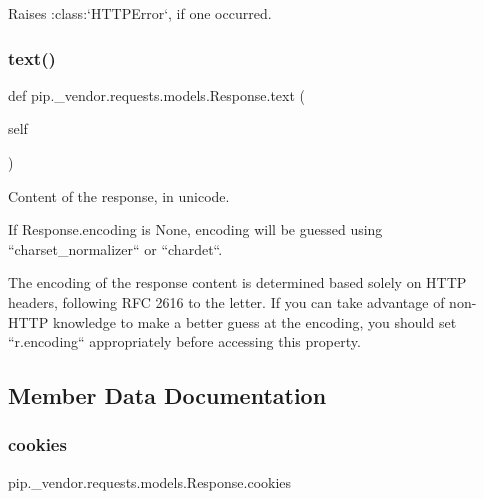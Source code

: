 \begin{DoxyVerb}Raises :class:`HTTPError`, if one occurred.\end{DoxyVerb}
 \mbox{\label{classpip_1_1__vendor_1_1requests_1_1models_1_1Response_a62a305a37be74c9dfaae9452fe2e2291}} 
\subsubsection{\texorpdfstring{text()}{text()}}
{\footnotesize\ttfamily def pip.\+\_\+vendor.\+requests.\+models.\+Response.\+text (\begin{DoxyParamCaption}\item[{}]{self }\end{DoxyParamCaption})}

\begin{DoxyVerb}Content of the response, in unicode.

If Response.encoding is None, encoding will be guessed using
``charset_normalizer`` or ``chardet``.

The encoding of the response content is determined based solely on HTTP
headers, following RFC 2616 to the letter. If you can take advantage of
non-HTTP knowledge to make a better guess at the encoding, you should
set ``r.encoding`` appropriately before accessing this property.
\end{DoxyVerb}
 

\subsection{Member Data Documentation}
\mbox{\label{classpip_1_1__vendor_1_1requests_1_1models_1_1Response_abc1815d684e50a622a378054800ffa56}} 
\subsubsection{\texorpdfstring{cookies}{cookies}}
{\footnotesize\ttfamily pip.\+\_\+vendor.\+requests.\+models.\+Response.\+cookies}

